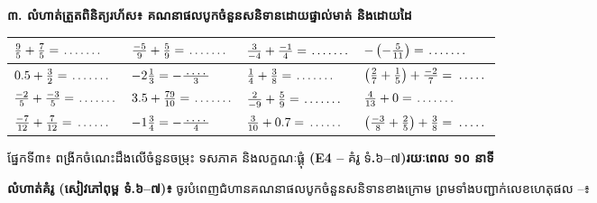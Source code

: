 \documentclass[a4paper,10pt]{article}
\newcommand{\enbf}[1]{{\TimesEn\bfseries #1}}
\newcommand{\cnum}[1]{\mbox{\fontsize{10pt}{12pt}\selectfont\ding{\numexpr181+#1\relax}}}
\newcommand{\blank}[1][1.5cm]{\makebox[#1]{\dotfill}}
\newcommand{\secbar}[2]{%
  \begin{tcolorbox}[enhanced, sharp corners, colback=headgray, colframe=black, boxrule=0.9pt, boxsep=1pt, top=2pt, bottom=2pt, left=5pt, right=5pt, before skip=4pt, after skip=3pt]
    {\muol\fontsize{9.2pt}{13pt}\selectfont #1}\hfill{\fontsize{8pt}{11pt}\selectfont\textbf{#2}}
  \end{tcolorbox}%
}
\begin{document}
\vspace{6pt}
\textbf{៣. លំហាត់ត្រួតពិនិត្យរហ័ស៖ គណនាផលបូកចំនួនសនិទានដោយផ្ទាល់មាត់ និងដោយដៃ}

\vspace{4pt}
{\renewcommand{\arraystretch}{1.74}
\begin{tabular}{|C{4.40cm}|C{4.40cm}|C{4.40cm}|C{4.40cm}|}
  \hline
  $\frac{9}{5} + \frac{7}{5} = \blank[1.1cm]$ & $\frac{-5}{9} + \frac{5}{9} = \blank[1.1cm]$ & $\frac{3}{-4} + \frac{-1}{4} = \blank[1.1cm]$ & $-\left(-\frac{5}{11}\right) = \blank[1.1cm]$ \\
  \hline
  $0.5 + \frac{3}{2} = \blank[1.1cm]$ & $-2\frac{1}{3} = -\frac{\blank[0.7cm]}{3}$ & $\frac{1}{4} + \frac{3}{8} = \blank[1.1cm]$ & $\left(\frac{2}{7}+\frac{1}{5}\right)+\frac{-2}{7} = \blank[0.9cm]$ \\
  \hline
  $\frac{-2}{5} + \frac{-3}{5} = \blank[1.1cm]$ & $3.5 + \frac{79}{10} = \blank[1.1cm]$ & $\frac{2}{-9} + \frac{5}{9} = \blank[1.1cm]$ & $\frac{4}{13} + 0 = \blank[1.1cm]$ \\
  \hline
  $\frac{-7}{12} + \frac{7}{12} = \blank[1.0cm]$ & $-1\frac{3}{4} = -\frac{\blank[0.7cm]}{4}$ & $\frac{3}{10} + 0.7 = \blank[1.0cm]$ & $\left(\frac{-3}{8}+\frac{2}{5}\right)+\frac{3}{8} = \blank[0.9cm]$ \\
  \hline
\end{tabular}}

\newpage

\secbar{ផ្នែកទី៣៖ ពង្រីកចំណេះដឹងលើចំនួនចម្រុះ ទសភាគ និងលក្ខណៈផ្គុំ \enbf{(E4 --} គំរូ ទំ\enbf{.}៦\enbf{--}៧\enbf{)}}{រយៈពេល ១០ នាទី}

\textbf{លំហាត់គំរូ (សៀវភៅពុម្ព ទំ.៦–៧)៖} ចូរបំពេញជំហានគណនាផលបូកចំនួនសនិទានខាងក្រោម ព្រមទាំងបញ្ជាក់លេខហេតុផល \cnum{1}--\cnum{5}៖
\end{document}
